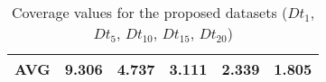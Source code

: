 \begin{table}[]
\begin{tabular}{|l|l|l|l|l|l|}
		\textbf{AVG} & \textbf{9.306}                                                           & \textbf{4.737}                                                           & \textbf{3.111}                                                            & \textbf{2.339}                                                            & \textbf{1.805}                                                            \\ \hline
	\end{tabular}
	\caption{Coverage values for the proposed datasets (\ie $Dt_{1}$, $Dt_{5}$, $Dt_{10}$, $Dt_{15}$, $Dt_{20}$)}
	\label{tab:coverage}
\end{table}
